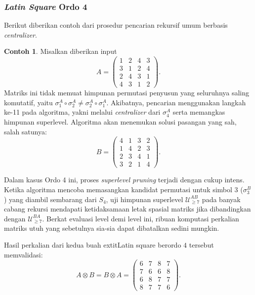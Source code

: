 \documentclass[journal]{IEEEtran}
\theoremstyle{definition}
\newtheorem{con}{Contoh}[section]
\theoremstyle{plain}
\begin{document}
\subsubsection{\textit{Latin Square} Ordo 4}
Berikut diberikan contoh dari prosedur pencarian rekursif umum berbasis \textit{centralizer}.
\begin{con}
    Misalkan diberikan input
    \begin{equation}
        A=
        \begin{pmatrix}
            1 & 2 & 4 & 3 \\
            3 & 1 & 2 & 4 \\
            2 & 4 & 3 & 1 \\
            4 & 3 & 1 & 2
        \end{pmatrix}.
    \end{equation}
    Matriks ini tidak memuat himpunan permutasi penyusun yang seluruhnya saling komutatif, yaitu $\sigma_1^A \circ \sigma_2^A \neq \sigma_2^A \circ \sigma_1^A$. Akibatnya, pencarian menggunakan langkah ke-11 pada algoritma, yakni melalui \textit{centralizer} dari $\sigma_4^A$ serta memangkas himpunan superlevel. Algoritma akan menemukan solusi pasangan yang sah, salah satunya:
    \begin{equation}
        B=
        \begin{pmatrix}
            4 & 1 & 3 & 2 \\
            1 & 4 & 2 & 3 \\
            2 & 3 & 4 & 1 \\
            3 & 2 & 1 & 4
        \end{pmatrix}.
    \end{equation}

    Dalam kasus Ordo 4 ini, proses \textit{superlevel pruning} terjadi dengan cukup intens. Ketika algoritma mencoba memasangkan kandidat permutasi untuk simbol $3$ ($\sigma_3^B$) yang diambil sembarang dari $S_4$, uji himpunan superlevel $\mathcal{U}_{\ge 7}^{AB}$ pada banyak cabang rekursi mendapati ketidaksamaan letak spasial matriks jika dibandingkan dengan $\mathcal{U}_{\ge 7}^{BA}$. Berkat evaluasi level demi level ini, ribuan komputasi perkalian matriks utuh yang sebetulnya sia-sia dapat dibatalkan sedini mungkin.

    Hasil perkalian dari kedua buah 	extit{Latin square} berordo $4$ tersebut memvalidasi:
    \begin{equation}
        A\otimes B=B\otimes A=
        \begin{pmatrix}
            6 & 7 & 8 & 7 \\
            7 & 6 & 6 & 8 \\
            6 & 8 & 7 & 7 \\
            8 & 7 & 7 & 6
        \end{pmatrix}.
    \end{equation}
\end{con}
\end{document}
